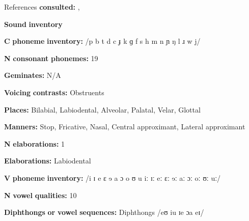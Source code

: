 \begin{styleBody}
References \textbf{consulted:} \citet{Lavergne1979}, \citet{Sapir1965}
\end{styleBody}

\begin{styleBody}
\textbf{Sound} \textbf{inventory}
\end{styleBody}

\begin{styleBody}
\textbf{C} \textbf{phoneme} \textbf{inventory:} /p b t d c ɟ k ɡ f s h m n ɲ ŋ l ɹ w j/
\end{styleBody}

\begin{styleBody}
\textbf{N} \textbf{consonant} \textbf{phonemes:} 19
\end{styleBody}

\begin{styleBody}
\textbf{Geminates:} N/A
\end{styleBody}

\begin{styleBody}
\textbf{Voicing} \textbf{contrasts:} Obstruents
\end{styleBody}

\begin{styleBody}
\textbf{Places:} Bilabial, Labiodental, Alveolar, Palatal, Velar, Glottal
\end{styleBody}

\begin{styleBody}
\textbf{Manners:} Stop, Fricative, Nasal, Central approximant, Lateral approximant
\end{styleBody}

\begin{styleBody}
\textbf{N} \textbf{elaborations:} 1
\end{styleBody}

\begin{styleBody}
\textbf{Elaborations:} Labiodental
\end{styleBody}

\begin{styleBody}
\textbf{V} \textbf{phoneme} \textbf{inventory:} /i ɪ e ɛ ɘ a ɔ o ʊ u iː ɪː eː ɛː ɘː aː ɔː oː ʊː uː/
\end{styleBody}

\begin{styleBody}
\textbf{N} \textbf{vowel} \textbf{qualities:} 10
\end{styleBody}

\begin{styleBody}
\textbf{Diphthongs} \textbf{or} \textbf{vowel} \textbf{sequences:} Diphthongs /eʊ iu ɪe ɔa eɪ/
\end{styleBody}

